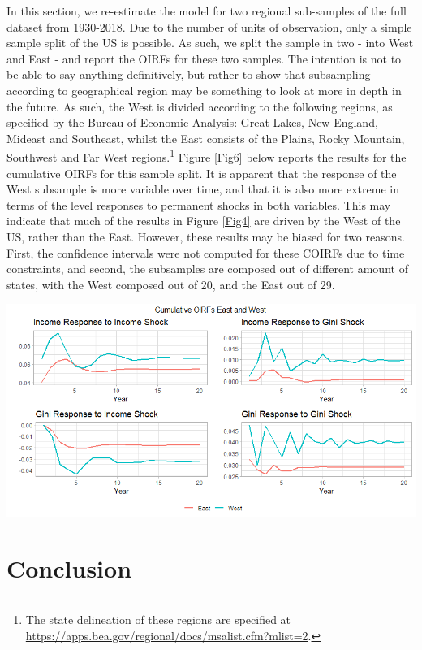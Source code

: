 \documentclass[11pt,preprint, authoryear]{elsarticle}
\let\origfigure\figure
\let\endorigfigure\endfigure
\renewenvironment{figure}[1][2] {
    \expandafter\origfigure\expandafter[H]
} {
    \endorigfigure
}
\numberwithin{equation}{section}
\numberwithin{figure}{section}
\numberwithin{table}{section}
\let\rmarkdownfootnote\footnote%
\def\footnote{\protect\rmarkdownfootnote}
\begin{document}
In this section, we re-estimate the model for two regional sub-samples
of the full dataset from 1930-2018. Due to the number of units of
observation, only a simple sample split of the US is possible. As such,
we split the sample in two - into West and East - and report the OIRFs
for these two samples. The intention is not to be able to say anything
definitively, but rather to show that subsampling according to
geographical region may be something to look at more in depth in the
future. As such, the West is divided according to the following regions,
as specified by the Bureau of Economic Analysis: Great Lakes, New
England, Mideast and Southeast, whilst the East consists of the Plains,
Rocky Mountain, Southwest and Far West regions.\footnote{The state
  delineation of these regions are specified at
  \url{https://apps.bea.gov/regional/docs/msalist.cfm?mlist=2}.} Figure
\ref{Fig6} below reports the results for the cumulative OIRFs for this
sample split. It is apparent that the response of the West subsample is
more variable over time, and that it is also more extreme in terms of
the level responses to permanent shocks in both variables. This may
indicate that much of the results in Figure \ref{Fig4} are driven by the
West of the US, rather than the East. However, these results may be
biased for two reasons. First, the confidence intervals were not
computed for these COIRFs due to time constraints, and second, the
subsamples are composed out of different amount of states, with the West
composed out of 20, and the East out of 29.

\begin{figure}[H]
\includegraphics[width=1\linewidth]{images/regional_COIRFs} \caption{\label{Fig6}}\label{fig:Fig6}
\end{figure}

\hypertarget{conclusion}{%
\section{\texorpdfstring{Conclusion
\label{Section 4}}{Conclusion }}\label{conclusion}}
\end{document}
